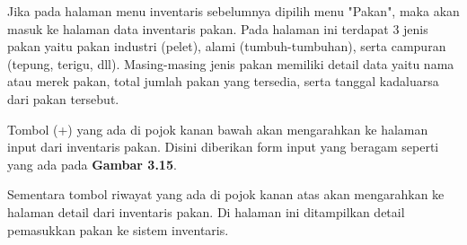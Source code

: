 \begin{spacing}{1.5}
	Jika pada halaman menu inventaris sebelumnya dipilih menu "Pakan", maka akan masuk ke halaman data inventaris pakan. Pada halaman ini terdapat 3 jenis pakan yaitu pakan industri (pelet), alami (tumbuh-tumbuhan), serta campuran (tepung, terigu, dll). Masing-masing jenis pakan memiliki detail data yaitu nama atau merek pakan, total jumlah pakan yang tersedia, serta tanggal kadaluarsa dari pakan tersebut.

	Tombol (+) yang ada di pojok kanan bawah akan mengarahkan ke halaman input dari inventaris pakan. Disini diberikan form input yang beragam seperti yang ada pada \textbf{Gambar 3.15}.

	Sementara tombol riwayat yang ada di pojok kanan atas akan mengarahkan ke halaman detail dari inventaris pakan. Di halaman ini ditampilkan detail pemasukkan pakan ke sistem inventaris.


\end{spacing}
